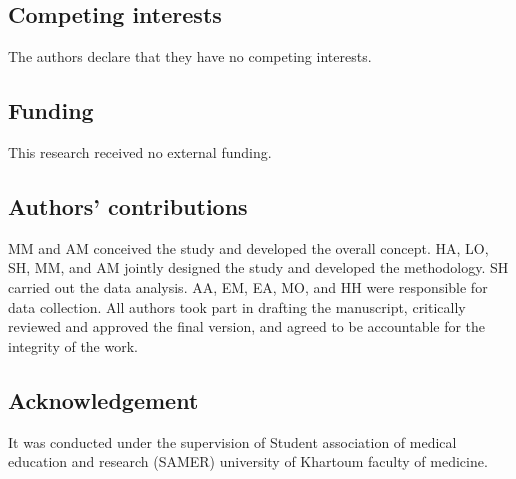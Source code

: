 \documentclass[12pt]{article}
\begin{document}
\subsection*{Competing interests}
The authors declare that they have no competing interests.

\subsection*{Funding}
This research received no external funding.

\subsection*{Authors' contributions}
MM and AM conceived the study and developed the overall concept. HA, LO, SH, MM, and AM jointly designed the study and developed the methodology. SH carried out the data analysis. AA, EM, EA, MO, and HH were responsible for data collection. All authors took part in drafting the manuscript, critically reviewed and approved the final version, and agreed to be accountable for the integrity of the work.

\subsection*{Acknowledgement}
It was conducted under the supervision of Student association of medical education and research (SAMER) university of Khartoum faculty of medicine.



\nocite{*}


\end{document}
